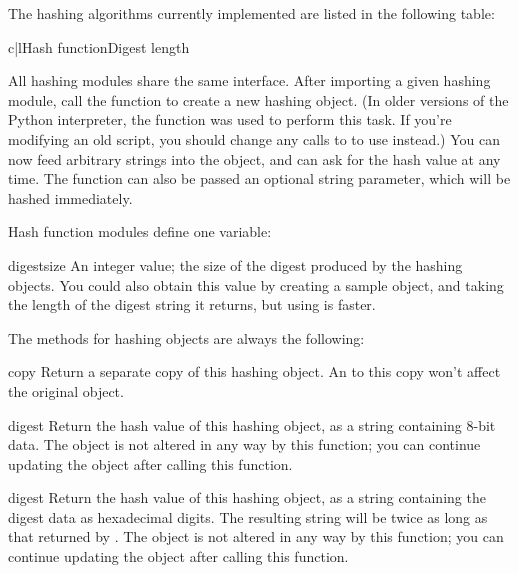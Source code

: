 \documentclass{howto}
\begin{document}
The hashing algorithms currently implemented are listed in the following table:

\begin{tableii}{c|l}{}{Hash function}{Digest length}
\end{tableii}

All hashing modules share the same interface.  After importing a given
hashing module, call the  function to create a new hashing
object. (In older versions of the Python interpreter, the 
function was used to perform this task.  If you're modifying an old script, you
should change any calls to  to use  instead.)  You
can now feed arbitrary strings into the object, and can ask for the
hash value at any time.  The  function can also be passed an
optional string parameter, which will be hashed immediately.

Hash function modules define one variable:

\begin{datadesc}{digestsize}
An integer value; the size of the digest
produced by the hashing objects.  You could also obtain this value by
creating a sample object, and taking the length of the digest string
it returns, but using  is faster.
\end{datadesc}

The methods for hashing objects are always the following:

\begin{funcdesc}{copy}{}
Return a separate copy of this hashing object.  An  to this
  copy won't affect the original object.
\end{funcdesc}

\begin{funcdesc}{digest}{}
Return the hash value of this hashing object, as a string containing 8-bit data.  The object is not
altered in any way by this function; you can continue updating the
object after calling this function.
\end{funcdesc}

\begin{funcdesc}{digest}{}
Return the hash value of this hashing object, as a string containing the
digest data as hexadecimal digits.  The resulting string will be twice
as long as that returned by .  The object is not altered
in any way by this function; you can continue updating the object after
calling this function.
\end{funcdesc}
\end{document}
